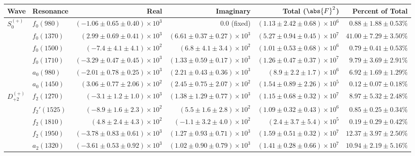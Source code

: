 \begin{table}[ht]
    \begin{center}
        \begin{tabular}{llrrrr}\toprule
        Wave & Resonance & Real & Imaginary & Total ($\abs{F}^2$) & Percent of Total \\\midrule
$S_{0}^{(+)}$ & $f_{0}(980)$ & $(-1.06 \pm 0.65 \pm 0.40) \times 10^{3}$ & $0.0$ (fixed) & $(1.13 \pm 2.42 \pm 0.68) \times 10^{6}$ & $0.88 \pm 1.88 \pm 0.53 \%$ \\
 & $f_{0}(1370)$ & $(2.99 \pm 0.69 \pm 0.41) \times 10^{3}$ & $(6.61 \pm 0.37 \pm 0.27) \times 10^{3}$ & $(5.27 \pm 0.94 \pm 0.45) \times 10^{7}$ & $41.00 \pm 7.29 \pm 3.50 \%$ \\
 & $f_{0}(1500)$ & $(-7.4 \pm 4.1 \pm 4.1) \times 10^{2}$ & $(6.8 \pm 4.1 \pm 3.4) \times 10^{2}$ & $(1.01 \pm 0.53 \pm 0.68) \times 10^{6}$ & $0.79 \pm 0.41 \pm 0.53 \%$ \\
 & $f_{0}(1710)$ & $(-3.29 \pm 0.47 \pm 0.45) \times 10^{3}$ & $(1.33 \pm 0.59 \pm 0.17) \times 10^{3}$ & $(1.26 \pm 0.47 \pm 0.37) \times 10^{7}$ & $9.79 \pm 3.69 \pm 2.91 \%$ \\
 & $a_{0}(980)$ & $(-2.01 \pm 0.78 \pm 0.25) \times 10^{3}$ & $(2.21 \pm 0.43 \pm 0.36) \times 10^{3}$ & $(8.9 \pm 2.2 \pm 1.7) \times 10^{6}$ & $6.92 \pm 1.69 \pm 1.29 \%$ \\
 & $a_{0}(1450)$ & $(3.06 \pm 0.77 \pm 2.06) \times 10^{2}$ & $(2.45 \pm 0.75 \pm 2.07) \times 10^{2}$ & $(1.54 \pm 0.89 \pm 2.26) \times 10^{5}$ & $0.12 \pm 0.07 \pm 0.18 \%$ \\
$D_{+2}^{(+)}$ & $f_{2}(1270)$ & $(-3.1 \pm 1.2 \pm 1.0) \times 10^{3}$ & $(1.38 \pm 1.29 \pm 0.77) \times 10^{3}$ & $(1.15 \pm 0.68 \pm 0.32) \times 10^{7}$ & $8.97 \pm 5.32 \pm 2.48 \%$ \\
 & $f_{2}'(1525)$ & $(-8.9 \pm 1.6 \pm 2.3) \times 10^{2}$ & $(5.5 \pm 1.6 \pm 2.8) \times 10^{2}$ & $(1.09 \pm 0.32 \pm 0.43) \times 10^{6}$ & $0.85 \pm 0.25 \pm 0.34 \%$ \\
 & $f_{2}(1810)$ & $(4.8 \pm 2.4 \pm 4.3) \times 10^{2}$ & $(-1.1 \pm 3.2 \pm 4.0) \times 10^{2}$ & $(2.4 \pm 3.7 \pm 5.4) \times 10^{5}$ & $0.19 \pm 0.29 \pm 0.42 \%$ \\
 & $f_{2}(1950)$ & $(-3.78 \pm 0.83 \pm 0.61) \times 10^{3}$ & $(1.27 \pm 0.93 \pm 0.71) \times 10^{3}$ & $(1.59 \pm 0.51 \pm 0.32) \times 10^{7}$ & $12.37 \pm 3.97 \pm 2.50 \%$ \\
 & $a_{2}(1320)$ & $(-3.61 \pm 0.53 \pm 0.92) \times 10^{3}$ & $(1.02 \pm 0.90 \pm 0.79) \times 10^{3}$ & $(1.41 \pm 0.28 \pm 0.66) \times 10^{7}$ & $10.94 \pm 2.19 \pm 5.16 \%$ \\

\end{tabular}
\end{center}
\end{table}
